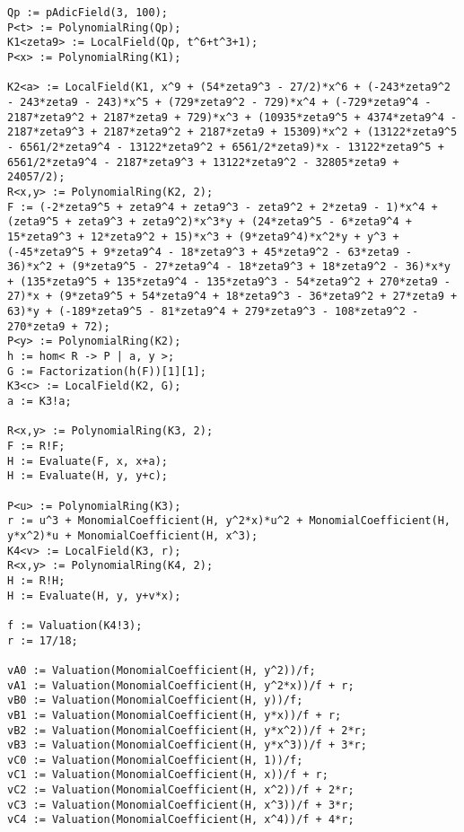 \documentclass[11pt]{amsart}
\theoremstyle{definition}
\begin{document}
\begin{lstlisting}[language=Magma,caption= Magma program. Used for computing another wild topological branch locus, label={code-1}]
Qp := pAdicField(3, 100);
P<t> := PolynomialRing(Qp);
K1<zeta9> := LocalField(Qp, t^6+t^3+1);
P<x> := PolynomialRing(K1);

K2<a> := LocalField(K1, x^9 + (54*zeta9^3 - 27/2)*x^6 + (-243*zeta9^2 - 243*zeta9 - 243)*x^5 + (729*zeta9^2 - 729)*x^4 + (-729*zeta9^4 - 2187*zeta9^2 + 2187*zeta9 + 729)*x^3 + (10935*zeta9^5 + 4374*zeta9^4 - 2187*zeta9^3 + 2187*zeta9^2 + 2187*zeta9 + 15309)*x^2 + (13122*zeta9^5 - 6561/2*zeta9^4 - 13122*zeta9^2 + 6561/2*zeta9)*x - 13122*zeta9^5 + 6561/2*zeta9^4 - 2187*zeta9^3 + 13122*zeta9^2 - 32805*zeta9 + 24057/2);
R<x,y> := PolynomialRing(K2, 2);
F := (-2*zeta9^5 + zeta9^4 + zeta9^3 - zeta9^2 + 2*zeta9 - 1)*x^4 + (zeta9^5 + zeta9^3 + zeta9^2)*x^3*y + (24*zeta9^5 - 6*zeta9^4 + 15*zeta9^3 + 12*zeta9^2 + 15)*x^3 + (9*zeta9^4)*x^2*y + y^3 + (-45*zeta9^5 + 9*zeta9^4 - 18*zeta9^3 + 45*zeta9^2 - 63*zeta9 - 36)*x^2 + (9*zeta9^5 - 27*zeta9^4 - 18*zeta9^3 + 18*zeta9^2 - 36)*x*y + (135*zeta9^5 + 135*zeta9^4 - 135*zeta9^3 - 54*zeta9^2 + 270*zeta9 - 27)*x + (9*zeta9^5 + 54*zeta9^4 + 18*zeta9^3 - 36*zeta9^2 + 27*zeta9 + 63)*y + (-189*zeta9^5 - 81*zeta9^4 + 279*zeta9^3 - 108*zeta9^2 - 270*zeta9 + 72);
P<y> := PolynomialRing(K2);
h := hom< R -> P | a, y >;
G := Factorization(h(F))[1][1];
K3<c> := LocalField(K2, G);
a := K3!a;

R<x,y> := PolynomialRing(K3, 2);
F := R!F;
H := Evaluate(F, x, x+a);
H := Evaluate(H, y, y+c);

P<u> := PolynomialRing(K3);
r := u^3 + MonomialCoefficient(H, y^2*x)*u^2 + MonomialCoefficient(H, y*x^2)*u + MonomialCoefficient(H, x^3);
K4<v> := LocalField(K3, r);
R<x,y> := PolynomialRing(K4, 2);
H := R!H;
H := Evaluate(H, y, y+v*x);

f := Valuation(K4!3);
r := 17/18;

vA0 := Valuation(MonomialCoefficient(H, y^2))/f;
vA1 := Valuation(MonomialCoefficient(H, y^2*x))/f + r;
vB0 := Valuation(MonomialCoefficient(H, y))/f;
vB1 := Valuation(MonomialCoefficient(H, y*x))/f + r;
vB2 := Valuation(MonomialCoefficient(H, y*x^2))/f + 2*r;
vB3 := Valuation(MonomialCoefficient(H, y*x^3))/f + 3*r;
vC0 := Valuation(MonomialCoefficient(H, 1))/f;
vC1 := Valuation(MonomialCoefficient(H, x))/f + r;
vC2 := Valuation(MonomialCoefficient(H, x^2))/f + 2*r;
vC3 := Valuation(MonomialCoefficient(H, x^3))/f + 3*r;
vC4 := Valuation(MonomialCoefficient(H, x^4))/f + 4*r;
\end{lstlisting}
\end{document}
